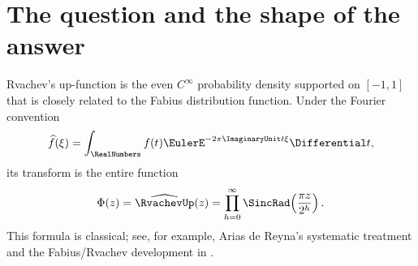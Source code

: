 \documentclass[11pt,oneside]{article}
\theoremstyle{definition}
\theoremstyle{remark}
\newcommand{\Phiup}{\Phi}
\begin{document}
\begin{abstract}
For the literal Cesaro question, the arithmetic-mean gauge
$g(x)=A_1E_{\kappa_1}(x)$, where $A_1=0.091266124131588\ldots$, gives shell means tending to
one and solves the requested two-sided boundedness condition.  It also gives convergence at
dyadic endpoints.  At unrestricted endpoints a nonconstant dyadic-mantissa profile remains,
governed by a continuous singular eigenmeasure of an explicit transfer operator.  We prove
that no gauge with a stabilizing within-shell shape (including powers and iterated logarithms,
regularly varying factors, and fixed log-periodic corrections) can remove this profile.  A completely
unrestricted exotic scale-dependent analytic gauge is not ruled out by that theorem.  The
multiplicatively natural logarithmic Cesaro mean does converge for all endpoints, with
normalizing constant $A_1^{\log}=0.09386063575678\ldots$.

Finally, the raw annular maximum
$\mathfrak M_k=\max_{2^k\le x\le2^{k+1}}|\Phi(x)|$ has a sharper boundary-layer law:
\[
 \log\mathfrak M_k
 =-\frac{\log2}{2}k^2-(\log2)\kappa_\infty k
 -\frac{W(c(k+1))^2+2W(c(k+1))}{2\log2}
 +O((\log\log k)^2),
\]
where $c=(\log2)\pi^{-1}\sqrt{3/2}$ and $W$ is the principal Lambert function.  Thus the
largest point in a shell approaches its left boundary and carries a second log-normal factor
on the $\log\log x$ scale.  In contrast, the unique lobe maxima immediately after powers of
two form explicit deep valleys with leading coefficient $-1/\log2$, twice the generic
log-square coefficient.  Together these results reconcile every substantive disagreement
among the source documents and give the final rigorous decay dictionary.
\end{abstract}

\tableofcontents
\newpage

\section{The question and the shape of the answer}
\label{sec:introduction}

Rvachev's up-function is the even $C^\infty$ probability density supported on $[-1,1]$
that is closely related to the Fabius distribution function.  Under the Fourier convention
\[
 \widehat f(\xi)=\int_{\RealNumbers}f(t)\EulerE^{-2\pi\ImaginaryUnit t\xi}\Differential t,
\]
its transform is the entire function
\begin{equation}
 \Phiup(z)=\widehat{\RvachevUp}(z)
 =\prod_{h=0}^{\infty}\SincRad\!\left(\frac{\pi z}{2^h}\right).
 \label{eq:Phi-definition}
\end{equation}
This formula is classical; see, for example, Arias de Reyna's systematic treatment
\cite{arias1982} and the Fabius/Rvachev development in \cite{proveit}.
\end{document}
